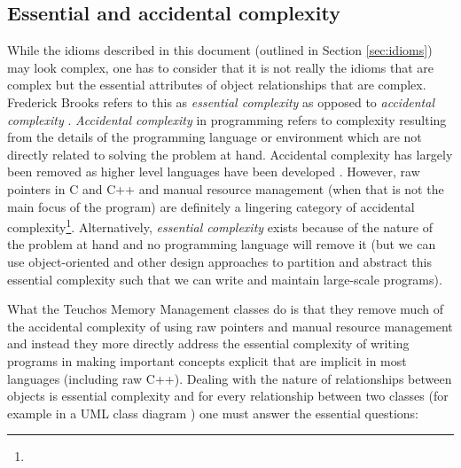 \documentclass[pdf,ps2pdf,11pt]{SANDreport}
\begin{document}
%
{}\subsection{Essential and accidental complexity}
\label{sec:essentail-accidental-complexity}
%

While the idioms described in this document (outlined in Section
{}\ref{sec:idioms}) may look complex, one has to consider that it is
not really the idioms that are complex but the essential attributes of
object relationships that are complex.  Frederick Brooks refers to
this as {}\textit{essential complexity} as opposed to
{}\textit{accidental complexity} {}\cite{MythicalManMonth95}.
{}\textit{Accidental complexity} in programming refers to complexity
resulting from the details of the programming language or environment
which are not directly related to solving the problem at hand.
Accidental complexity has largely been removed as higher level
languages have been developed {}\cite[Chapter 16]{MythicalManMonth95}.
However, raw pointers in C and C++ and manual resource management
(when that is not the main focus of the program) are definitely a
lingering category of accidental complexity\footnote{
{}}.
Alternatively, {}\textit{essential complexity} exists because of the
nature of the problem at hand and no programming language will remove
it (but we can use object-oriented and other design approaches to
partition and abstract this essential complexity such that we can
write and maintain large-scale programs).

What the Teuchos Memory Management classes do is that they remove much
of the accidental complexity of using raw pointers and manual resource
management and instead they more directly address the essential
complexity of writing programs in making important concepts explicit
that are implicit in most languages (including raw C++).  Dealing with
the nature of relationships between objects is essential complexity
and for every relationship between two classes (for example in a UML
class diagram {}\cite{UMLDistilledThirdEdition04}) one must answer the
essential questions:
\end{document}
